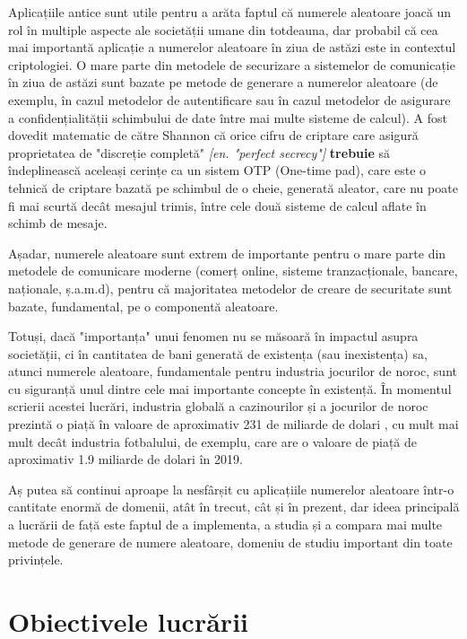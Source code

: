 Aplicațiile antice sunt utile pentru a arăta faptul că numerele aleatoare joacă un rol în multiple aspecte ale societății umane din totdeauna, dar probabil că cea mai importantă aplicație a numerelor aleatoare în ziua de astăzi este in contextul criptologiei. O mare parte din metodele de securizare a sistemelor de comunicație în ziua de astăzi sunt bazate pe metode de generare a numerelor aleatoare (de exemplu, în cazul metodelor de autentificare sau în cazul metodelor de asigurare a confidențialității schimbului de date între mai multe sisteme de calcul). A fost dovedit matematic de către Shannon \cite{art:shannon:secrecy:1949} că orice cifru de criptare care asigură proprietatea de "discreție completă" \textit{[en. "perfect secrecy"]} \textbf{trebuie} să îndeplinească aceleași cerințe ca un sistem OTP (One-time pad), care este o tehnică de criptare bazată pe schimbul de o cheie, generată aleator, care nu poate fi mai scurtă decât mesajul trimis, între cele două sisteme de calcul aflate în schimb de mesaje.

Așadar, numerele aleatoare sunt extrem de importante pentru o mare parte din metodele de comunicare moderne (comerț online, sisteme tranzacționale, bancare, naționale, ș.a.m.d), pentru că majoritatea metodelor de creare de securitate sunt bazate, fundamental, pe o componentă aleatoare.

Totuși, dacă "importanța" unui fenomen nu se măsoară în impactul asupra societății, ci în cantitatea de bani generată de existența (sau inexistența) sa, atunci numerele aleatoare, fundamentale pentru industria jocurilor de noroc, sunt cu siguranță unul dintre cele mai importante concepte în existență. În momentul scrierii acestei lucrări, industria globală a cazinourilor și a jocurilor de noroc prezintă o piață în valoare de aproximativ 231 de miliarde de dolari \cite{misc:web:statista:gambling}, cu mult mai mult decât industria fotbalului, de exemplu, care are o valoare de piață de aproximativ 1.9 miliarde de dolari în 2019.

Aș putea să continui aproape la nesfârșit cu aplicațiile numerelor aleatoare într-o cantitate enormă de domenii, atât în trecut, cât și în prezent, dar ideea principală a lucrării de față este faptul de a implementa, a studia și a compara mai multe metode de generare de numere aleatoare, domeniu de studiu important din toate privințele.

\pagebreak

\section{Obiectivele lucrării}



\renewcommand{\thesection}{\arabic{section}}
\renewcommand{\thesubsection}{\thesection.\arabic{subsection}}




